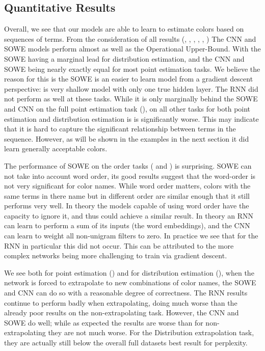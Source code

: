 \documentclass[11pt,a4paper]{article}
\begin{document}
	\clearpage


\subsection{Quantitative Results}\label{sec:quantitative-results}

Overall, we see that our models are able to learn to estimate colors based on sequences of terms.
From the consideration of all results (, , , , , )
The CNN and SOWE models perform almost as well as the Operational Upper-Bound.
With the SOWE having a marginal lead for distribution estimation,
and the CNN and SOWE being nearly exactly equal for most point estimation tasks.
We believe the reason for this is the SOWE is an easier to learn model from a gradient descent perspective: is very shallow model with only one true hidden layer.
The RNN did not perform as well at these tasks.
While it is only marginally behind the SOWE and CNN on the full point estimation task (), on all other tasks for both point estimation and distribution estimation is is significantly worse.
This may indicate that it is  hard to capture the significant relationship between terms in the sequence.
However, as will be shown in the examples in the next section it did learn generally acceptable colors.


The performance of SOWE on the order tasks ( and ) is surprising.
SOWE can not take into account word order, its good results suggest that the word-order is not very significant for color names.
While word order matters, colors with the same terms in there name but in different order are similar enough that it still performs very well.
In theory the models capable of using word order have the capacity to ignore it, and thus could achieve a similar result.
In theory an RNN can learn to perform a sum of its inputs (the word embeddings),
and the CNN can learn to weight all non-unigram filters to zero.
In practice we see that for the RNN in particular this did not occur.
This can be attributed to the more complex networks being more challenging to train via gradient descent.






We see both for point estimation () and for distribution estimation (), when the network is forced to extrapolate to new combinations of color names, the SOWE and CNN can do so with a reasonable degree of correctness.
The RNN results continue to perform badly when extrapolating, doing much worse than the already poor results on the non-extrapolating task.
However, the CNN and SOWE do well; while as expected the results are worse than for non-extrapolating they are not much worse.
For the Distribution extrapolation task, they are actually still below the overall full datasets best result for perplexity.
\end{document}

